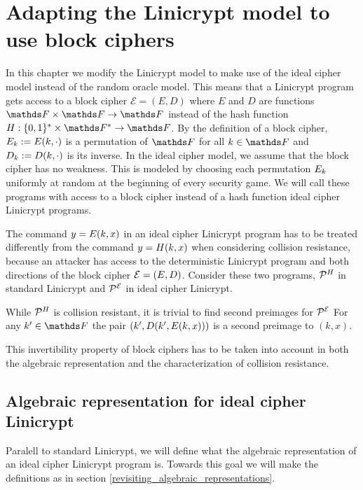 \section{Adapting the Linicrypt model to use block ciphers}

In this chapter we modify the Linicrypt model to make use of the ideal cipher model instead of the random oracle model.
This means that a Linicrypt program gets access to a block cipher $\mathcal{E} = (E, D)$ where $E$ and $D$ are functions $\F \times \F \to \F$
instead of the hash function $\H : \{0,1\}^* \times \F^* \to \F$.
By the definition of a block cipher,
$E_k := E(k, \cdot)$ is a permutation of $\F$ for all $k \in \F$ and
$D_k := D(k, \cdot)$ is its inverse.
In the ideal cipher model, we assume that the block cipher has no weakness.
This is modeled by choosing each permutation $E_k$ uniformly at random at the beginning of every security game.
We will call these programs with access to a block cipher instead of a hash function ideal cipher Linicrypt programs.

The command $y = E(k, x)$ in an ideal cipher Linicrypt program has to be treated differently from the command $y = H(k, x)$ when considering collision resistance,
because an attacker has access to the deterministic Linicrypt program and both directions of the block cipher $\mathcal{E} = (E, D)$.
Consider these two programs, $\mathcal{P}^H_{\mathsf{}}$ in standard Linicrypt and $\mathcal{P}^{\mathcal{E}}_{\mathsf{}}$ in ideal cipher Linicrypt.

\begin{pchstack}[center,space=2cm]
\end{pchstack}
While $\mathcal{P}^H_{\mathsf{}}$ is collision resistant, it is trivial to find second preimages for $\mathcal{P}^{\mathcal{E}}_{\mathsf{}}$
For any $k' \in \F$ the pair $(k', D(k', E(k, x)))$ is a second preimage to $(k,x)$.

This invertibility property of block ciphers has to be taken into account
in both the algebraic representation and the characterization of collision resistance.

\subsection{Algebraic representation for ideal cipher Linicrypt}

Paralell to standard Linicrypt, we will define what the algebraic representation of an ideal cipher Linicrypt program is.
Towards this goal we will make the definitions as in section \ref{revisiting_algebraic_representations}.

